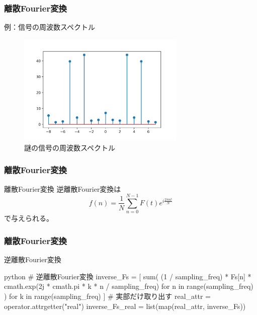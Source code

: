 \documentclass[dvipdfmx,11pt,notheorems]{beamer}
\theoremstyle{definition}
\begin{document}
\begin{frame}[fragile]\frametitle{離散Fourier変換}

\begin{block}{例：信号の周波数スペクトル}
\begin{figure}
  \centering
  \includegraphics[width=8cm]{stem.png}
  \caption{謎の信号の周波数スペクトル}
\end{figure}

\end{block}
\end{frame}

\begin{frame}[fragile]\frametitle{離散Fourier変換}
\begin{block}{離散Fourier変換}
逆離散Fourier変換は
\begin{equation*}
f(n) = \frac{1}{N}\sum^{N-1}_{n=0}F(t)e^{i \frac{2\pi n  t }{N}}
\end{equation*}
で与えられる。
\end{block}
\end{frame}

\begin{frame}[fragile]\frametitle{離散Fourier変換}
\begin{exampleblock}{逆離散Fourier変換}
\begin{pygments}{python}
# 逆離散Fourier変換
inverse_Fs = [
    sum(
        (1 / sampling_freq)
        * Fs[n]
        * cmath.exp(2j * cmath.pi * k * n / sampling_freq)
        for n in range(sampling_freq)
    )
    for k in range(sampling_freq)
]
# 実部だけ取り出す
real_attr = operator.attrgetter("real")
inverse_Fs_real = list(map(real_attr, inverse_Fs))
\end{pygments}
\end{exampleblock}

\end{frame}
\end{document}
